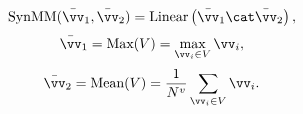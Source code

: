 \begin{equation}
\text{SynMM}(\bar{\vv}_1, \bar{\vv}_2) = \text{Linear}\left(\bar{\vv}_1 \cat \bar{\vv}_2\right),
\end{equation}
\begin{equation}
    \bar{\vv}_1 = \text{Max}(V) = \max _{\vv_i \in V} \vv_i,
\end{equation}
\begin{equation}
     \bar{\vv}_2 = \text{Mean}(V) = \frac{1}{N^v} \sum_{\vv_i \in V} \vv_i.
\end{equation}
 